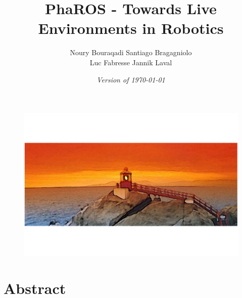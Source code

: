 \documentclass[a4paper,10pt,twoside]{book}
\begin{document}
\frontmatter
\setcounter{page}{1}
\pagestyle{headings}
\author{
	Noury Bouraqadi\quad
	Santiago Bragagniolo\quad \\
	Luc Fabresse\quad 
	Jannik Laval
	}
\title{\Huge\bf PhaROS - Towards Live Environments in Robotics}
\date{\emph{Version of \today}}

\begin{figure}[h!]
  		
  		\centering
    		\includegraphics[width=1\textwidth]{Figures/pharos-portrait.png}
		\maketitle
		\centering
\end{figure}

\maketitle

\newpage

%

\tableofcontents
\sloppy %
\mainmatter

\chapter{Abstract}
	
\end{document}
